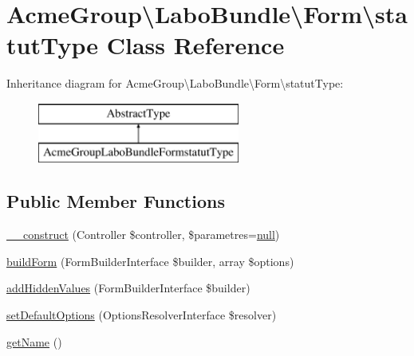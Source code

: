 \hypertarget{class_acme_group_1_1_labo_bundle_1_1_form_1_1statut_type}{\section{Acme\+Group\textbackslash{}Labo\+Bundle\textbackslash{}Form\textbackslash{}statut\+Type Class Reference}
\label{class_acme_group_1_1_labo_bundle_1_1_form_1_1statut_type}
}
Inheritance diagram for Acme\+Group\textbackslash{}Labo\+Bundle\textbackslash{}Form\textbackslash{}statut\+Type\+:\begin{figure}[H]
\begin{center}
\leavevmode
\includegraphics[height=2.000000cm]{class_acme_group_1_1_labo_bundle_1_1_form_1_1statut_type}
\end{center}
\end{figure}
\subsection*{Public Member Functions}
\begin{DoxyCompactItemize}
\item 
\hyperlink{class_acme_group_1_1_labo_bundle_1_1_form_1_1statut_type_a36aed96b0f3c4ed18d9aa132ff95402f}{\+\_\+\+\_\+construct} (Controller \$controller, \$parametres=\hyperlink{validate_8js_afb8e110345c45e74478894341ab6b28e}{null})
\item 
\hyperlink{class_acme_group_1_1_labo_bundle_1_1_form_1_1statut_type_acae50786f64879885b87e7ed23ad15b8}{build\+Form} (Form\+Builder\+Interface \$builder, array \$options)
\item 
\hyperlink{class_acme_group_1_1_labo_bundle_1_1_form_1_1statut_type_ab808417717edaf000a5a57c89e3b7c2e}{add\+Hidden\+Values} (Form\+Builder\+Interface \$builder)
\item 
\hyperlink{class_acme_group_1_1_labo_bundle_1_1_form_1_1statut_type_a2583292328c424eb1023e0f2e0bc160f}{set\+Default\+Options} (Options\+Resolver\+Interface \$resolver)
\item 
\hyperlink{class_acme_group_1_1_labo_bundle_1_1_form_1_1statut_type_a1ee198425d2bc8269b42530c7a987879}{get\+Name} ()
\end{DoxyCompactItemize}


